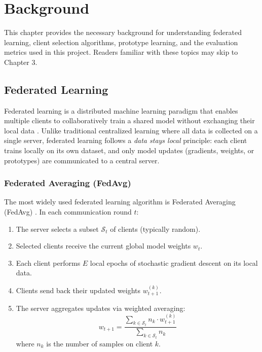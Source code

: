 \chapter{Background}

This chapter provides the necessary background for understanding federated learning, client selection algorithms, prototype learning, and the evaluation metrics used in this project. Readers familiar with these topics may skip to Chapter 3.

\section{Federated Learning}

Federated learning is a distributed machine learning paradigm that enables multiple clients to collaboratively train a shared model without exchanging their local data \citep{mcmahan2017communication}. Unlike traditional centralized learning where all data is collected on a single server, federated learning follows a \emph{data stays local} principle: each client trains locally on its own dataset, and only model updates (gradients, weights, or prototypes) are communicated to a central server.

\subsection{Federated Averaging (FedAvg)}

The most widely used federated learning algorithm is Federated Averaging (FedAvg) \citep{mcmahan2017communication}. In each communication round \(t\):

\begin{enumerate}
    \item The server selects a subset \(\mathcal{S}_t\) of clients (typically random).
    \item Selected clients receive the current global model weights \(w_t\).
    \item Each client performs \(E\) local epochs of stochastic gradient descent on its local data.
    \item Clients send back their updated weights \(w_{t+1}^{(k)}\).
    \item The server aggregates updates via weighted averaging:
    \[
    w_{t+1} = \frac{\sum_{k \in \mathcal{S}_t} n_k \cdot w_{t+1}^{(k)}}{\sum_{k \in \mathcal{S}_t} n_k}
    \]
    where \(n_k\) is the number of samples on client \(k\).
\end{enumerate}

